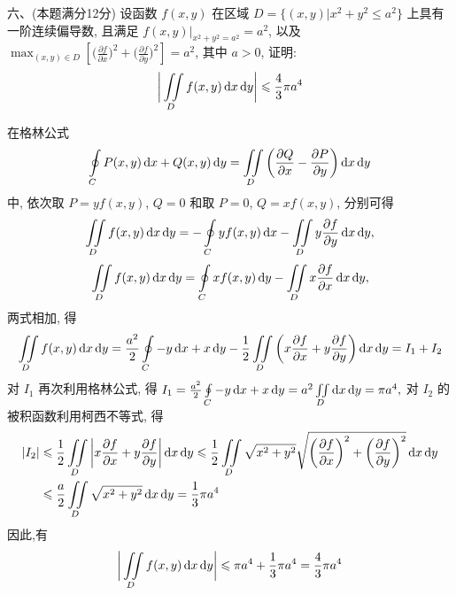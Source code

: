 \documentclass[11pt,twoside]{article} %
\begin{document}
\newpage
六、(本题满分12分)\;
设函数 $f(x,y)$ 在区域 $D=\big\{(x,y)\big|x^2+y^2\leqslant a^2\big\}$ 上具有一阶连续偏导数, 且满足 $f(x,y)\Big|_{x^2+y^2=a^2}=a^2$, 以及 $\max_{(x,y)\in D}\left[\bigg(\frac{\partial f}{\partial x}\bigg)^2+\bigg(\frac{\partial f}{\partial y}\bigg)^2\right]=a^2$, 其中 $a>0$, 证明: 
\[\bigg|\iint\limits_Df(x,y)\mathop{}\!\mathrm{d} x\mathop{}\!\mathrm{d} y\bigg|\leqslant\frac{4}{3}\pi a^4\]
\begin{Solution}
在格林公式\[\oint\limits_CP(x,y)\mathop{}\!\mathrm{d} x+Q(x,y)\mathop{}\!\mathrm{d} y=\iint\limits_D\left(\frac{\partial Q}{\partial x}-\frac{\partial P}{\partial y}\right)\mathop{}\!\mathrm{d} x\mathop{}\!\mathrm{d} y \]
中, 依次取 $P=yf(x,y)$, $Q=0$ 和取 $P=0$, $Q=xf(x,y)$, 分别可得
\[\iint\limits_Df(x,y)\mathop{}\!\mathrm{d} x\mathop{}\!\mathrm{d} y=-\oint\limits_Cyf(x,y)\mathop{}\!\mathrm{d} x-\iint\limits_Dy\frac{\partial f}{\partial y}\mathop{}\!\mathrm{d} x\mathop{}\!\mathrm{d} y,\]
\[\iint\limits_Df(x,y)\mathop{}\!\mathrm{d} x\mathop{}\!\mathrm{d} y=\oint\limits_Cxf(x,y)\mathop{}\!\mathrm{d} y-\iint\limits_Dx\frac{\partial f}{\partial x}\mathop{}\!\mathrm{d} x\mathop{}\!\mathrm{d} y,\]
两式相加, 得
\[\iint\limits_Df(x,y)\mathop{}\!\mathrm{d} x\mathop{}\!\mathrm{d} y=\frac{a^2}{2}\oint\limits_C-y\mathop{}\!\mathrm{d} x+x\mathop{}\!\mathrm{d} y-\frac{1}{2}\iint\limits_D\left(x\frac{\partial f}{\partial x}+y\frac{\partial f}{\partial y}\right)\mathop{}\!\mathrm{d} x\mathop{}\!\mathrm{d} y=I_1+I_2\]
对 $I_1$ 再次利用格林公式, 得 $I_1=\frac{a^2}{2}\oint\limits_C-y\mathop{}\!\mathrm{d} x+x\mathop{}\!\mathrm{d} y=a^2\iint\limits_D\mathop{}\!\mathrm{d} x\mathop{}\!\mathrm{d} y=\pi a^4,$
对 $I_2$ 的被积函数利用柯西不等式, 得
\begin{align*}
|I_2|&\leqslant\frac{1}{2}\iint\limits_D\left|x\frac{\partial f}{\partial x}+y\frac{\partial f}{\partial y}\right|\mathop{}\!\mathrm{d} x\mathop{}\!\mathrm{d} y\leqslant\frac{1}{2}\iint\limits_D\sqrt{x^2+y^2}\sqrt{\bigg(\frac{\partial f}{\partial x}\bigg)^2+\bigg(\frac{\partial f}{\partial y}\bigg)^2}\mathop{}\!\mathrm{d} x\mathop{}\!\mathrm{d} y\\
&\leqslant\frac{a}{2}\iint\limits_D\sqrt{x^2+y^2}\mathop{}\!\mathrm{d} x\mathop{}\!\mathrm{d} y=\frac{1}{3}\pi a^4
\end{align*}
因此,有
\[\bigg|\iint\limits_Df(x,y)\mathop{}\!\mathrm{d} x\mathop{}\!\mathrm{d} y\bigg|\leqslant\pi a^4+\frac{1}{3}\pi a^4=\frac{4}{3}\pi a^4\]
\end{Solution}
\end{document}
